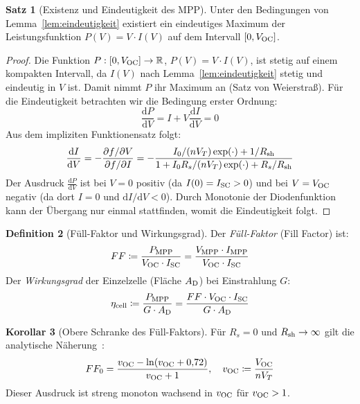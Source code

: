 ﻿\documentclass[a4paper,12pt]{article}
\theoremstyle{definition}
\newtheorem{definition}{Definition}[section]
\newtheorem{korollar}[definition]{Korollar}
\newtheorem{satz}[definition]{Satz}
\theoremstyle{remark}
\newcommand{\R}{\mathbb{R}}
\newcommand{\diff}{\mathrm{d}}
\begin{document}
\begin{satz}[Existenz und Eindeutigkeit des MPP]
\label{satz:mpp}
Unter den Bedingungen von Lemma~\ref{lem:eindeutigkeit} existiert ein eindeutiges
Maximum der Leistungsfunktion $P(V) = V \cdot I(V)$ auf dem Intervall
$[0, V_{\rm OC}]$.
\end{satz}

\begin{proof}
Die Funktion $P: [0, V_{\rm OC}] \to \R$, $P(V) = V \cdot I(V)$, ist
stetig auf einem kompakten Intervall, da $I(V)$ nach Lemma~\ref{lem:eindeutigkeit}
stetig und eindeutig in $V$ ist. Damit nimmt $P$ ihr Maximum an (Satz von
Weierstraß). Für die Eindeutigkeit betrachten wir die Bedingung erster Ordnung:
\begin{equation}
  \frac{\diff P}{\diff V} = I + V \frac{\diff I}{\diff V} = 0
  \label{eq:mpp_bed}
\end{equation}
Aus dem impliziten Funktionensatz folgt:
\begin{equation}
  \frac{\diff I}{\diff V} = -\frac{\partial f/\partial V}{\partial f/\partial I}
  = -\frac{I_0/(nV_T)\exp(\cdot) + 1/R_{\rm sh}}{1 + I_0 R_s/(nV_T)\exp(\cdot) + R_s/R_{\rm sh}}
  \label{eq:didv}
\end{equation}
Der Ausdruck $\frac{\diff P}{\diff V}$ ist bei $V=0$ positiv (da $I(0) = I_{\rm SC} > 0$)
und bei $V = V_{\rm OC}$ negativ (da dort $I = 0$ und $\diff I/\diff V < 0$).
Durch Monotonie der Diodenfunktion kann der Übergang nur einmal stattfinden,
womit die Eindeutigkeit folgt.
\end{proof}

\begin{definition}[Füll-Faktor und Wirkungsgrad]
\label{def:ff}
Der \emph{Füll-Faktor} (Fill Factor) ist:
\begin{equation}
  FF \coloneqq \frac{P_{\rm MPP}}{V_{\rm OC} \cdot I_{\rm SC}}
              = \frac{V_{\rm MPP} \cdot I_{\rm MPP}}{V_{\rm OC} \cdot I_{\rm SC}}
  \label{eq:ff}
\end{equation}
Der \emph{Wirkungsgrad} der Einzelzelle (Fläche $A_{\rm D}$) bei Einstrahlung $G$:
\begin{equation}
  \eta_{\rm cell} \coloneqq \frac{P_{\rm MPP}}{G \cdot A_{\rm D}}
                           = \frac{FF \cdot V_{\rm OC} \cdot I_{\rm SC}}{G \cdot A_{\rm D}}
  \label{eq:eta}
\end{equation}
\end{definition}

\begin{korollar}[Obere Schranke des Füll-Faktors]
\label{kor:ff}
Für $R_s = 0$ und $R_{\rm sh} \to \infty$ gilt die analytische Näherung~\cite{Green1982}:
\begin{equation}
  FF_0 = \frac{v_{\rm OC} - \ln(v_{\rm OC} + 0{,}72)}{v_{\rm OC} + 1},
  \quad v_{\rm OC} \coloneqq \frac{V_{\rm OC}}{nV_T}
  \label{eq:ff0}
\end{equation}
Dieser Ausdruck ist streng monoton wachsend in $v_{\rm OC}$ für $v_{\rm OC} > 1$.
\end{korollar}
\end{document}

